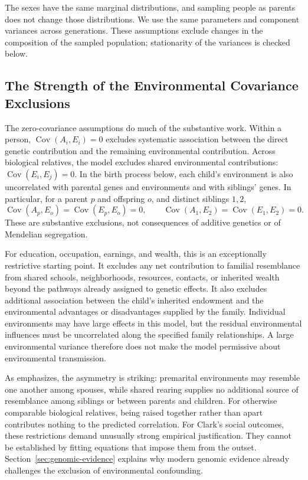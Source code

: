 The sexes have the same marginal distributions, and sampling people as
parents does not change those distributions. We use the same parameters
and component variances across generations. These assumptions exclude
changes in the composition of the sampled population; stationarity of
the variances is checked below.

\subsection{The Strength of the Environmental Covariance Exclusions}
\label{sec:environmental-exclusions}

The zero-covariance assumptions do much of the substantive work. Within
a person, $\operatorname{Cov}(A_i,E_i)=0$ excludes systematic association
between the direct genetic contribution and the remaining environmental
contribution. Across biological relatives, the model excludes shared
environmental contributions: $\operatorname{Cov}(E_i,E_j)=0$. In the birth
process below, each child's environment is also uncorrelated with parental
genes and environments and with siblings' genes. In particular, for a
parent $p$ and offspring $o$, and distinct siblings $1,2$,
\[
 \operatorname{Cov}(A_p,E_o)=\operatorname{Cov}(E_p,E_o)=0,
 \qquad
 \operatorname{Cov}(A_1,E_2)=\operatorname{Cov}(E_1,E_2)=0.
\]
These are substantive exclusions, not consequences of additive genetics
or of Mendelian segregation.

For education, occupation, earnings, and wealth, this is an exceptionally
restrictive starting point. It excludes any net contribution to familial
resemblance from shared schools, neighborhoods, resources, contacts, or
inherited wealth beyond the pathways already assigned to genetic effects.
It also excludes additional association between the child's inherited
endowment and the environmental advantages or disadvantages supplied by
the family. Individual environments may have large effects in this model,
but the residual environmental influences must be uncorrelated along the
specified family relationships. A large environmental variance therefore
does not make the model permissive about environmental transmission.

As \citet[pp.~10--11]{Goldberger1978} emphasizes, the asymmetry is striking:
premarital environments may resemble one another among spouses, while
shared rearing supplies no additional source of resemblance among
siblings or between parents and children. For otherwise comparable
biological relatives, being raised together rather than apart contributes
nothing to the predicted correlation. For Clark's social outcomes, these
restrictions demand unusually strong empirical justification. They cannot
be established by fitting equations that impose them from the outset.
Section~\ref{sec:genomic-evidence} explains why modern genomic evidence
already challenges the exclusion of environmental confounding.

